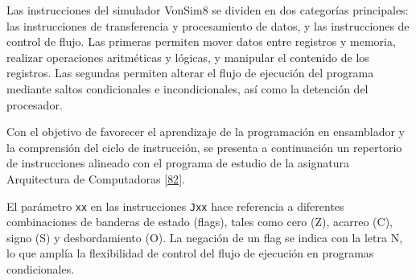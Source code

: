 \documentclass[12pt,oneside]{templates/unerthesis}
\begin{document}
Las instrucciones del simulador VonSim8 se dividen en dos categorías principales: las instrucciones de transferencia y procesamiento de datos, y las instrucciones de control de flujo. Las primeras permiten mover datos entre registros y memoria, realizar operaciones aritméticas y lógicas, y manipular el contenido de los registros. Las segundas permiten alterar el flujo de ejecución del programa mediante saltos condicionales e incondicionales, así como la detención del procesador.

Con el objetivo de favorecer el aprendizaje de la programación en ensamblador y la comprensión del ciclo de instrucción, se presenta a continuación un repertorio de instrucciones alineado con el programa de estudio de la asignatura Arquitectura de Computadoras \protect\hyperlink{ref-cd023_25_programa2025}{{[}82{]}}.

\begin{table}[!h]
\centering
\caption{\label{tab:setreducido}Tabla de instrucciones de VonSim8}
\centering
{}
\end{table}

El parámetro \texttt{xx} en las instrucciones \texttt{Jxx} hace referencia a diferentes combinaciones de banderas de estado (flags), tales como cero (Z), acarreo (C), signo (S) y desbordamiento (O). La negación de un flag se indica con la letra N, lo que amplía la flexibilidad de control del flujo de ejecución en programas condicionales.
\end{document}
